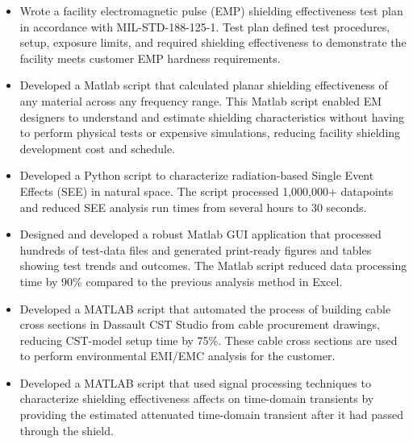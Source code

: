 \documentclass[letterpaper,12pt]{article}
\newcommand{\simpleParagraph}[1]{
    \vspace{-1pt}
    \begin{adjustwidth}{7pt}{0pt}
        #1
    \end{adjustwidth}
}
\newcommand{\matlab}[0]{
    Matlab
}
\begin{document}
    \simpleParagraph{
        \begin{itemize}
            \item Wrote a facility electromagnetic pulse (EMP) shielding effectiveness test plan in
                accordance with MIL-STD-188-125-1. Test plan defined test procedures, setup, exposure
                limits, and required shielding effectiveness to demonstrate the facility meets customer 
                EMP hardness requirements.

            \item Developed a \matlab script that calculated planar shielding effectiveness of any
                material across any frequency range. This \matlab script enabled EM designers to understand
                and estimate shielding characteristics without having to perform physical tests or expensive 
                simulations, reducing facility shielding development cost and schedule.

            \item Developed a Python script to characterize radiation-based Single Event Effects (SEE) in
                natural space. The script processed 1,000,000+ datapoints and reduced SEE analysis
                run times from several hours to 30 seconds.

            \item Designed and developed a robust \matlab GUI application that processed hundreds
                of test-data files and generated print-ready figures and tables showing test trends and outcomes.
                The \matlab script reduced data processing time by 90\% compared to the previous analysis 
                method in Excel.

            \item Developed a MATLAB script that automated the process of building cable cross sections
                in Dassault CST Studio from cable procurement drawings, reducing CST-model setup time by 75\%.
                These cable cross sections are used to perform environmental EMI/EMC analysis for the 
                customer.

            \item Developed a MATLAB script that used signal processing techniques to characterize
                shielding effectiveness affects on time-domain transients by providing the estimated 
                attenuated time-domain transient after it had passed through the shield.


        \end{itemize}
    }
\end{document}

